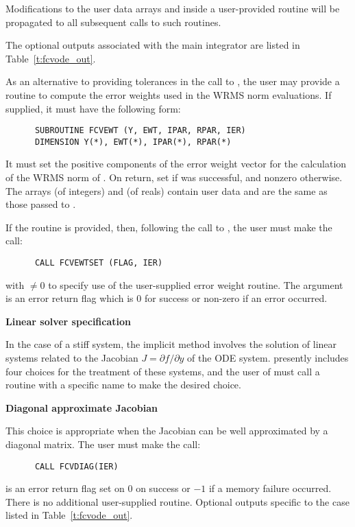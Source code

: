 \begin{Steps}
{    Modifications to the user data arrays  and  inside a 
    user-provided routine will be propagated to all subsequent calls to
    such routines.

    The optional outputs associated with the main {\cvode} integrator
    are listed in Table~\ref{t:fcvode_out}.
  }

  As an alternative to providing tolerances in the call to , the
  user may provide a routine to compute the error weights used in the WRMS norm
  evaluations. If supplied, it must have the following form:
\begin{verbatim}
      SUBROUTINE FCVEWT (Y, EWT, IPAR, RPAR, IER)
      DIMENSION Y(*), EWT(*), IPAR(*), RPAR(*)
\end{verbatim}
  It must set the positive components of the error weight vector  for
  the calculation of the WRMS norm of . On return, set
   if  was successful, and nonzero otherwise.
  The arrays  (of integers) and  (of reals) contain user data
  and are the same as those passed to .

  If the  routine is provided, then, 
  following the call to , the user must make the call:
\begin{verbatim}
      CALL FCVEWTSET (FLAG, IER)
\end{verbatim}
  with  $\neq 0$ to specify use of the user-supplied error weight routine.
  The argument  is an error return flag which is $0$ 
  for success or non-zero if an error occurred.

\item\label{i:fcvode_lin_solv_spec} {\bf Linear solver specification} 
  
  In the case of a stiff system, the implicit  method involves the solution
  of linear systems related to the Jacobian $J = \partial f / \partial y$
  of the ODE system.  {\cvode} presently includes four choices for the treatment
  of these systems, and the user of {\fcvode} must call a routine with a
  specific name to make the desired choice.


  {\s} {\bf Diagonal approximate Jacobian}
  
  This choice is appropriate when the Jacobian can be well approximated by
  a diagonal matrix.  The user must make the call:
\begin{verbatim}
      CALL FCVDIAG(IER)
\end{verbatim}
   is an error return flag set on $0$ on success or $-1$ if a memory 
  failure occurred.
  There is no additional user-supplied routine. Optional outputs specific
  to the {\diag} case listed in Table~\ref{t:fcvode_out}.
  

\end{Steps}
